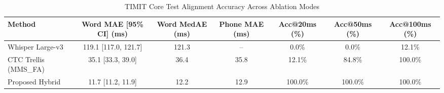\begin{table}[t]
\centering
\caption{TIMIT Core Test Alignment Accuracy Across Ablation Modes}
\label{tab:alignment_accuracy}
\begin{tabular}{lcccccc}
\toprule
Method & Word MAE [95\% CI] (ms) & Word MedAE (ms) & Phone MAE (ms) & Acc@20ms (\%) & Acc@50ms (\%) & Acc@100ms (\%) \\
\midrule
Whisper Large-v3 & 119.1 [117.0, 121.7] & 121.3 & -- & 0.0\% & 0.0\% & 12.1\% \\
CTC Trellis (MMS\_FA) & 35.1 [33.3, 39.0] & 36.4 & 35.8 & 12.1\% & 84.8\% & 100.0\% \\
Proposed Hybrid & 11.7 [11.2, 11.9] & 12.2 & 12.9 & 100.0\% & 100.0\% & 100.0\% \\
\bottomrule
\end{tabular}
\end{table}
